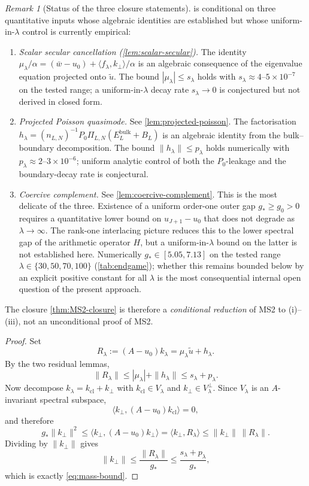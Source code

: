 \documentclass[12pt,a4paper]{article}
\theoremstyle{definition}
\theoremstyle{remark}
\newtheorem{remark}[theorem]{Remark}
\newcommand{\ip}[2]{\langle #1, #2 \rangle}
\newcommand{\norm}[1]{\| #1 \|}
\newcommand{\utilde}{\tilde{u}}
\begin{document}
\begin{remark}[Status of the three closure statements]
\label{rem:endgame-status}
 is conditional on three quantitative inputs whose
algebraic identities are established but whose uniform-in-$\lambda$
control is currently empirical:
\begin{enumerate}[label=(\roman*),leftmargin=*]
  \item \emph{Scalar secular cancellation
  \textup{(\cref{lem:scalar-secular})}.}  The identity
  $\mu_\lambda/\alpha = (\bar w - u_0) + \ip{f_\lambda}{k_\perp}/\alpha$
  is an algebraic consequence of the eigenvalue equation projected onto
  $\utilde$.  The bound $|\mu_\lambda| \le s_\lambda$ holds with
  $s_\lambda \approx 4$--$5 \times 10^{-7}$ on the tested range; a
  uniform-in-$\lambda$ decay rate $s_\lambda \to 0$ is conjectured but
  not derived in closed form.
  \item \emph{Projected Poisson quasimode.}
  See \cref{lem:projected-poisson}.  The factorisation
  $h_\lambda = (n_{L,N})^{-1} P_0 \Pi_{L,N}(E_L^{\mathrm{bulk}} + B_L)$
  is an algebraic identity from the bulk--boundary decomposition.  The
  bound $\norm{h_\lambda} \le p_\lambda$ holds numerically with
  $p_\lambda \approx 2$--$3 \times 10^{-6}$; uniform analytic control
  of both the $P_0$-leakage and the boundary-decay rate is conjectural.
  \item \emph{Coercive complement.}
  See \cref{lem:coercive-complement}.  This is the most
  delicate of the three.  Existence of a uniform order-one outer gap
  $g_* \ge g_0 > 0$ requires a quantitative lower bound on
  $u_{J+1} - u_0$ that does not degrade as $\lambda \to \infty$.  The
  rank-one interlacing picture reduces this to the lower spectral gap
  of the arithmetic operator $H$, but a uniform-in-$\lambda$ bound on
  the latter is not established here.  Numerically
  $g_* \in [5.05, 7.13]$ on the tested range
  $\lambda \in \{30, 50, 70, 100\}$ (\cref{tab:endgame}); whether this
  remains bounded below by an explicit positive constant for all
  $\lambda$ is the most consequential internal open question of the
  present approach.
\end{enumerate}
The closure \cref{thm:MS2-closure} is therefore a \emph{conditional
reduction} of MS2 to (i)--(iii), not an unconditional proof of MS2.
\end{remark}

\begin{proof}
Set
\[
  R_\lambda := (A-u_0)k_\lambda = \mu_\lambda \utilde + h_\lambda.
\]
By the two residual lemmas,
\[
  \norm{R_\lambda}
  \le |\mu_\lambda| + \norm{h_\lambda}
  \le s_\lambda + p_\lambda.
\]
Now decompose $k_\lambda = k_{\mathrm{cl}} + k_\perp$ with
$k_{\mathrm{cl}} \in V_\lambda$ and $k_\perp \in V_\lambda^\perp$.
Since $V_\lambda$ is an $A$-invariant spectral subspace,
\[
  \ip{k_\perp}{(A-u_0)k_{\mathrm{cl}}} = 0,
\]
and therefore
\[
  g_* \norm{k_\perp}^2
  \le
  \ip{k_\perp}{(A-u_0)k_\perp}
  =
  \ip{k_\perp}{R_\lambda}
  \le
  \norm{k_\perp}\,\norm{R_\lambda}.
\]
Dividing by $\norm{k_\perp}$ gives
\[
  \norm{k_\perp}
  \le
  \frac{\norm{R_\lambda}}{g_*}
  \le
  \frac{s_\lambda+p_\lambda}{g_*},
\]
which is exactly \eqref{eq:mass-bound}.
\end{proof}
\end{document}
